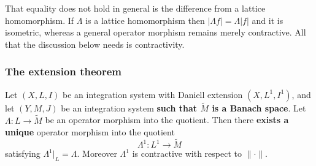 \begin{remark}
  That equality does not hold in general is the difference from a lattice
  homomorphism.
  If $\Lambda$ is a lattice homomorphism then $|\Lambda f|=\Lambda|f|$ and it is
  isometric, whereas a general operator morphism remains merely contractive.
  All that the discussion below needs is contractivity.
\end{remark}

\subsubsection{The extension theorem}

\begin{theorem}\label{thm:operator-extension}
  Let $(X,L,I)$ be an integration system with Daniell extension
  $(X,L^1,I^1)$, and let $(Y,M,J)$ be an integration system
  \textbf{such that $\widetilde{M}$ is a Banach space}.
  Let $\Lambda:L\to\widetilde{M}$ be an operator morphism into the quotient.
  Then there \textbf{exists a unique} operator morphism into the quotient
  \[
    \Lambda^1:L^1\to\widetilde{M}
  \]
  satisfying $\Lambda^1|_L=\Lambda$.
  Moreover $\Lambda^1$ is contractive with respect to $\|\cdot\|$.
\end{theorem}
